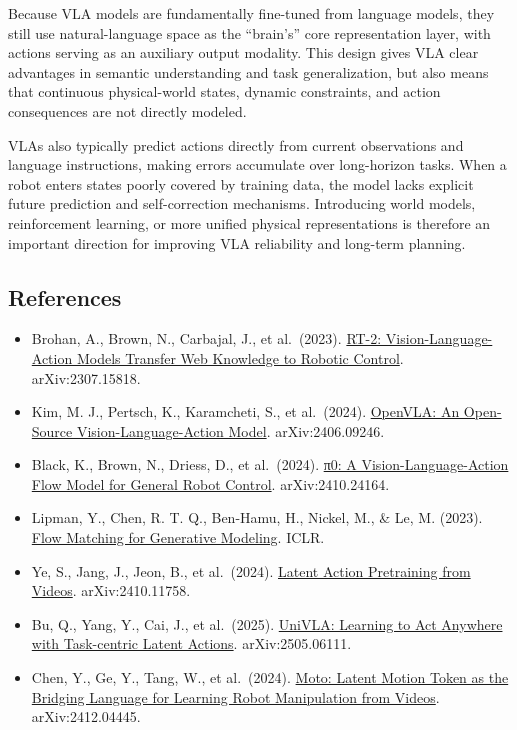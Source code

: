 Because VLA models are fundamentally fine-tuned from language models, they still use natural-language space as the ``brain's'' core representation layer, with actions serving as an auxiliary output modality. This design gives VLA clear advantages in semantic understanding and task generalization, but also means that continuous physical-world states, dynamic constraints, and action consequences are not directly modeled.

VLAs also typically predict actions directly from current observations and language instructions, making errors accumulate over long-horizon tasks. When a robot enters states poorly covered by training data, the model lacks explicit future prediction and self-correction mechanisms. Introducing world models, reinforcement learning, or more unified physical representations is therefore an important direction for improving VLA reliability and long-term planning.

\FloatBarrier
{}
\hypertarget{references-152}{%
\subsection{References}\label{references-152}}

\vspace{0.25em}
\begin{itemize}
\tightlist
\item
  Brohan, A., Brown, N., Carbajal, J., et al.~(2023). \href{https://arxiv.org/abs/2307.15818}{RT-2: Vision-Language-Action Models Transfer Web Knowledge to Robotic Control}. arXiv:2307.15818.
\item
  Kim, M. J., Pertsch, K., Karamcheti, S., et al.~(2024). \href{https://arxiv.org/abs/2406.09246}{OpenVLA: An Open-Source Vision-Language-Action Model}. arXiv:2406.09246.
\item
  Black, K., Brown, N., Driess, D., et al.~(2024). \href{https://arxiv.org/abs/2410.24164}{π0: A Vision-Language-Action Flow Model for General Robot Control}. arXiv:2410.24164.
\item
  Lipman, Y., Chen, R. T. Q., Ben-Hamu, H., Nickel, M., \& Le, M. (2023). \href{https://arxiv.org/abs/2210.02747}{Flow Matching for Generative Modeling}. ICLR.
\item
  Ye, S., Jang, J., Jeon, B., et al.~(2024). \href{https://arxiv.org/abs/2410.11758}{Latent Action Pretraining from Videos}. arXiv:2410.11758.
\item
  Bu, Q., Yang, Y., Cai, J., et al.~(2025). \href{https://arxiv.org/abs/2505.06111}{UniVLA: Learning to Act Anywhere with Task-centric Latent Actions}. arXiv:2505.06111.
\item
  Chen, Y., Ge, Y., Tang, W., et al.~(2024). \href{https://arxiv.org/abs/2412.04445}{Moto: Latent Motion Token as the Bridging Language for Learning Robot Manipulation from Videos}. arXiv:2412.04445.
\end{itemize}

\clearpage
